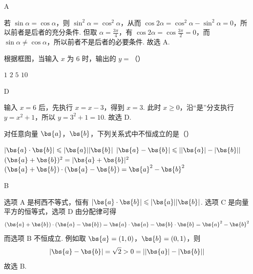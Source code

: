 \begin{answer}
A
\end{answer}

\begin{solution}
若 \(\sin\alpha=\cos\alpha\)，则 \(\sin^2\alpha=\cos^2\alpha\)，从而 \(\cos2\alpha=\cos^2\alpha-\sin^2\alpha=0\)，所以前者是后者的充分条件. 但取 \(\alpha=\frac{3\pi}{4}\)，有 \(\cos2\alpha=\cos\frac{3\pi}{2}=0\)，而 \(\sin\alpha\ne\cos\alpha\)，所以前者不是后者的必要条件. 故选 A.
\end{solution}

\begin{problem}
根据框图，当输入 \(x\) 为 \(6\) 时，输出的 \(y =\)（\quad）


\choices
    {\(1\)}
    {\(2\)}
    {\(5\)}
    {\(10\)}
\end{problem}

\begin{answer}
D
\end{answer}

\begin{solution}
输入 \(x=6\) 后，先执行 \(x=x-3\)，得到 \(x=3\). 此时 \(x\geqslant0\)，沿“是”分支执行 \(y=x^2+1\)，所以 \(y=3^2+1=10\). 故选 D.
\end{solution}

\begin{problem}
对任意向量 \(\bs{a}\)，\(\bs{b}\)，下列关系式中不恒成立的是（\quad）

\choices
    {\( |\bs{a} \cdot \bs{b}| \leqslant |\bs{a}||\bs{b}| \)}
    {\( |\bs{a} - \bs{b}| \leqslant ||\bs{a}| - |\bs{b}|| \)}
    {\((\bs{a} + \bs{b})^2 = |\bs{a} + \bs{b}|^2\)}
    {\((\bs{a} + \bs{b})\cdot (\bs{a} - \bs{b}) = \bs{a}^2 - \bs{b}^2\)}
\end{problem}

\begin{answer}
B
\end{answer}

\begin{solution}
选项 A 是柯西不等式，恒有 \(\lvert\bs{a}\cdot\bs{b}\rvert\leqslant\lvert\bs{a}\rvert\lvert\bs{b}\rvert\). 选项 C 是向量平方的恒等式，选项 D 由分配律可得
\[
(\bs{a}+\bs{b})\cdot(\bs{a}-\bs{b})=\bs{a}\cdot\bs{a}-\bs{b}\cdot\bs{b}=\bs{a}^{2}-\bs{b}^{2}
\]
而选项 B 不恒成立. 例如取 \(\bs{a}=(1,0)\)，\(\bs{b}=(0,1)\)，则
\[
\lvert\bs{a}-\bs{b}\rvert=\sqrt{2}>0=\left\lvert\lvert\bs{a}\rvert-\lvert\bs{b}\rvert\right\rvert
\]
故选 B.
\end{solution}

